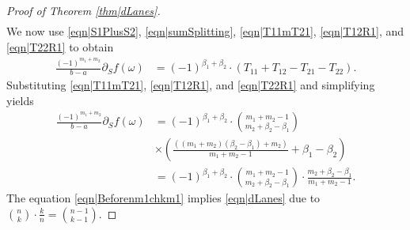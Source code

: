 \documentclass[reqno]{amsart}
\begin{document}
\begin{appendix}
\begin{proof}[Proof of Theorem \ref{thm|dLanes}]
\begin{align}
\end{align} 
We now use \eqref{eqn|S1PlusS2},  
\eqref{eqn|sumSplitting}, \eqref{eqn|T11mT21}, \eqref{eqn|T12R1}, and 
\eqref{eqn|T22R1} to obtain
\begin{align}
\frac{(-1)^{m_1+m_2}}{b-a}\partial_Sf(\omega)
&=(-1)^{\beta_1+\beta_2}\cdot\left(T_{11}+T_{12}-T_{21}-T_{22}\right).
\label{eqn|AfterSubstitution}
\end{align}
Substituting \eqref{eqn|T11mT21}, \eqref{eqn|T12R1}, and \eqref{eqn|T22R1} 
and simplifying yields
\begin{align}
\frac{(-1)^{m_1+m_2}}{b-a}\partial_Sf(\omega)
&=(-1)^{\beta_1+\beta_2}\cdot \binom{m_1+m_2-1}{m_2+\beta_2-\beta_1}\nonumber\\
&\times\left(\frac{\left((m_1+m_2)(\beta_2-\beta_1)+m_2\right)}{m_1+m_2-1}
+\beta_1-\beta_2\right) \nonumber \\
&=(-1)^{\beta_1+\beta_2}\cdot \binom{m_1+m_2-1}{m_2+\beta_2-\beta_1}
\cdot \frac{m_2+\beta_2-\beta_1}{m_1+m_2-1}. \label{eqn|Beforenm1chkm1}
\end{align}
The equation \eqref{eqn|Beforenm1chkm1} implies \eqref{eqn|dLanes} 
due to $\binom{n}{k}\cdot \frac{k}{n}=\binom{n-1}{k-1}$.
\end{proof} 

\end{appendix}
\end{document}
